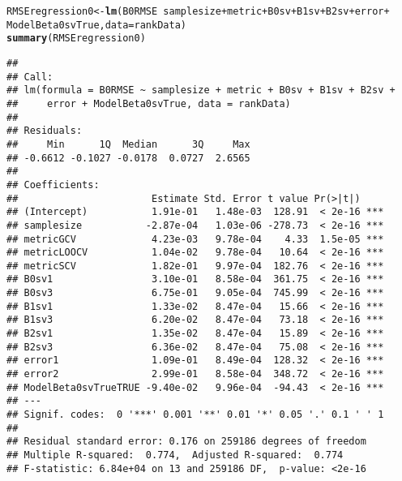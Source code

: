 \documentclass{article}\usepackage[]{graphicx}\usepackage[]{color}
\makeatletter
\newcommand{\hlopt}[1]{\textcolor[rgb]{0,0,0}{#1}}%
\newcommand{\hlstd}[1]{\textcolor[rgb]{0.345,0.345,0.345}{#1}}%
\newcommand{\hlkwb}[1]{\textcolor[rgb]{0.69,0.353,0.396}{#1}}%
\newcommand{\hlkwc}[1]{\textcolor[rgb]{0.333,0.667,0.333}{#1}}%
\newcommand{\hlkwd}[1]{\textcolor[rgb]{0.737,0.353,0.396}{\textbf{#1}}}%
\newenvironment{kframe}{%
 \def\at@end@of@kframe{}%
 \ifinner\ifhmode%
  \def\at@end@of@kframe{\end{minipage}}%
  \begin{minipage}{\columnwidth}%
 \fi\fi%
 \def\FrameCommand##1{\hskip\@totalleftmargin \hskip-\fboxsep
 \colorbox{shadecolor}{##1}\hskip-\fboxsep
     \hskip-\linewidth \hskip-\@totalleftmargin \hskip\columnwidth}%
 \MakeFramed {\advance\hsize-\width
   \@totalleftmargin\z@ \linewidth\hsize
   \@setminipage}}%
 {\par\unskip\endMakeFramed%
 \at@end@of@kframe}
\newenvironment{knitrout}{}{} %
\makeatother
\begin{document}
\begin{knitrout}
\color{fgcolor}\begin{kframe}
\begin{alltt}
\hlstd{RMSEregression0} \hlkwb{<-} \hlkwd{lm}\hlstd{(B0RMSE} \hlopt{~} \hlstd{samplesize} \hlopt{+} \hlstd{metric} \hlopt{+} \hlstd{B0sv} \hlopt{+} \hlstd{B1sv} \hlopt{+} \hlstd{B2sv} \hlopt{+} \hlstd{error} \hlopt{+}
    \hlstd{ModelBeta0svTrue,} \hlkwc{data} \hlstd{= rankData)}
\hlkwd{summary}\hlstd{(RMSEregression0)}
\end{alltt}
\begin{verbatim}
## 
## Call:
## lm(formula = B0RMSE ~ samplesize + metric + B0sv + B1sv + B2sv + 
##     error + ModelBeta0svTrue, data = rankData)
## 
## Residuals:
##     Min      1Q  Median      3Q     Max 
## -0.6612 -0.1027 -0.0178  0.0727  2.6565 
## 
## Coefficients:
##                       Estimate Std. Error t value Pr(>|t|)    
## (Intercept)           1.91e-01   1.48e-03  128.91  < 2e-16 ***
## samplesize           -2.87e-04   1.03e-06 -278.73  < 2e-16 ***
## metricGCV             4.23e-03   9.78e-04    4.33  1.5e-05 ***
## metricLOOCV           1.04e-02   9.78e-04   10.64  < 2e-16 ***
## metricSCV             1.82e-01   9.97e-04  182.76  < 2e-16 ***
## B0sv1                 3.10e-01   8.58e-04  361.75  < 2e-16 ***
## B0sv3                 6.75e-01   9.05e-04  745.99  < 2e-16 ***
## B1sv1                 1.33e-02   8.47e-04   15.66  < 2e-16 ***
## B1sv3                 6.20e-02   8.47e-04   73.18  < 2e-16 ***
## B2sv1                 1.35e-02   8.47e-04   15.89  < 2e-16 ***
## B2sv3                 6.36e-02   8.47e-04   75.08  < 2e-16 ***
## error1                1.09e-01   8.49e-04  128.32  < 2e-16 ***
## error2                2.99e-01   8.58e-04  348.72  < 2e-16 ***
## ModelBeta0svTrueTRUE -9.40e-02   9.96e-04  -94.43  < 2e-16 ***
## ---
## Signif. codes:  0 '***' 0.001 '**' 0.01 '*' 0.05 '.' 0.1 ' ' 1
## 
## Residual standard error: 0.176 on 259186 degrees of freedom
## Multiple R-squared:  0.774,	Adjusted R-squared:  0.774 
## F-statistic: 6.84e+04 on 13 and 259186 DF,  p-value: <2e-16
\end{verbatim}
\end{kframe}
\end{knitrout}
\end{document}
